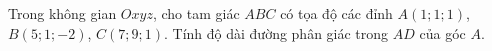 \begin{ex}
Trong không gian $Oxyz$, cho tam giác $ABC$ có tọa độ các đỉnh $A(1;1;1)$, $B(5;1;-2)$, $C(7;9;1)$. Tính độ dài đường phân giác trong $AD$ của góc $A$.
\end{ex}

